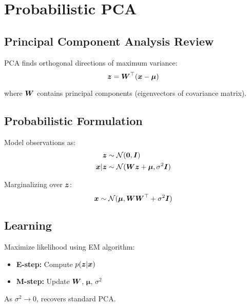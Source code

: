 
\section{Probabilistic PCA }
\label{sec:prob-pca}

\subsection{Principal Component Analysis Review}

PCA finds orthogonal directions of maximum variance:
\begin{equation}
\boldsymbol{z} = \boldsymbol{W}^\top (\boldsymbol{x} - \boldsymbol{\mu})
\end{equation}

where $\boldsymbol{W}$ contains principal components (eigenvectors of covariance matrix).

\subsection{Probabilistic Formulation}

Model observations as:
\begin{align}
\boldsymbol{z} &\sim \mathcal{N}(\boldsymbol{0}, \boldsymbol{I}) \\
\boldsymbol{x} | \boldsymbol{z} &\sim \mathcal{N}(\boldsymbol{W}\boldsymbol{z} + \boldsymbol{\mu}, \sigma^2 \boldsymbol{I})
\end{align}

Marginalizing over $\boldsymbol{z}$:
\begin{equation}
\boldsymbol{x} \sim \mathcal{N}(\boldsymbol{\mu}, \boldsymbol{W}\boldsymbol{W}^\top + \sigma^2 \boldsymbol{I})
\end{equation}

\subsection{Learning}

Maximize likelihood using EM algorithm:
\begin{itemize}
    \item \textbf{E-step:} Compute $p(\boldsymbol{z}|\boldsymbol{x})$
    \item \textbf{M-step:} Update $\boldsymbol{W}$, $\boldsymbol{\mu}$, $\sigma^2$
\end{itemize}

As $\sigma^2 \to 0$, recovers standard PCA.


